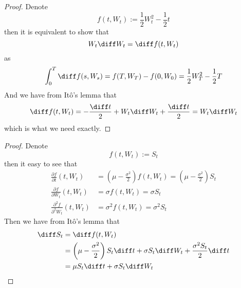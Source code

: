 \newcommand{\trans}{\mathrm T}

    \problem
    \begin{proof}
        Denote
        \[f(t,W_t):=\frac{1}{2}W_t^2-\frac{1}{2}t\]
        then it is equivalent to show that
        \[W_t\diff W_t=\diff f(t,W_t)\]
        as
        \[\int_0^T\diff f(s,W_s)=f(T,W_T)-f(0,W_0)=
        \frac{1}{2}W_T^2-\frac{1}{2}T\]
        And we have from It\^o's lemma that
        \[\diff f(t,W_t)=-\frac{\diff t}{2}+W_t\diff W_t
        +\frac{\diff t}{2}=W_t\diff W_t\]
        which is what we need exactly.
    \end{proof}

    \problem
    \begin{proof}
        Denote
        \[f(t,W_t):=S_t\]
        then it easy to see that
        \[\begin{aligned}
            \frac{\partial f}{\partial t}(t,W_t)
            &=\left(\mu-\frac{\sigma^2}{2}\right)f(t,W_t)
            =\left(\mu-\frac{\sigma^2}{2}\right)S_t\\
            \frac{\partial f}{\partial W_t}(t,W_t)
            &=\sigma f(t,W_t)=\sigma S_t\\
            \frac{\partial^2 f}{\partial^2 W_t}(t,W_t)
            &=\sigma^2 f(t,W_t)=\sigma^2 S_t
        \end{aligned}\]
        Then we have from It\^o's lemma that
        \[\begin{aligned}
            \diff S_t&=\diff f(t,W_t)\\
            &=\left(\mu-\frac{\sigma^2}{2}\right)S_t\diff t
            +\sigma S_t\diff W_t+\frac{\sigma^2 S_t}{2}\diff t\\
            &=\mu S_t\diff t+\sigma S_t\diff W_t
        \end{aligned}\]
    \end{proof}

